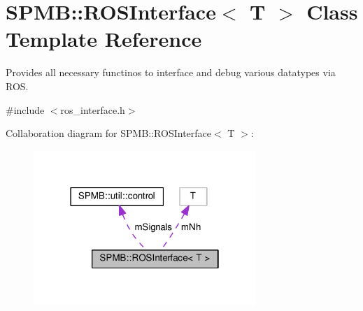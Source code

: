 \hypertarget{classSPMB_1_1ROSInterface}{}\section{S\+P\+MB\+:\+:R\+O\+S\+Interface$<$ T $>$ Class Template Reference}
\label{classSPMB_1_1ROSInterface}


Provides all necessary functinos to interface and debug various datatypes via R\+OS.  




{\ttfamily \#include $<$ros\+\_\+interface.\+h$>$}



Collaboration diagram for S\+P\+MB\+:\+:R\+O\+S\+Interface$<$ T $>$\+:\nopagebreak
\begin{figure}[H]
\begin{center}
\leavevmode
\includegraphics[width=238pt]{classSPMB_1_1ROSInterface__coll__graph}
\end{center}
\end{figure}
